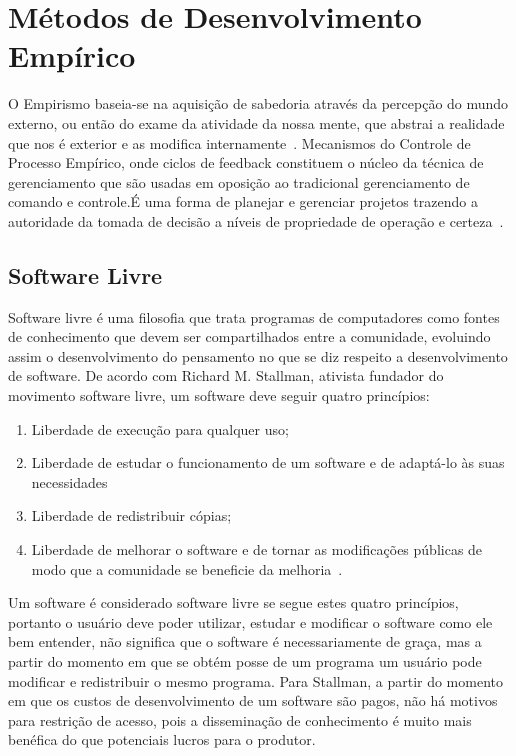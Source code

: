 \chapter{Métodos de Desenvolvimento Empírico}
\label{cap:desenvolvimento-empirico}

O Empirismo baseia-se na aquisição de sabedoria através da percepção do mundo externo, 
ou então do exame da atividade da nossa mente, que abstrai a realidade que nos
é exterior e as modifica internamente~\cite{chaui2003}.
%
Mecanismos do Controle de Processo Empírico, onde ciclos de feedback constituem o
núcleo da técnica de gerenciamento que são usadas em oposição ao tradicional 
gerenciamento de comando e controle.É uma forma de planejar e gerenciar projetos 
trazendo a autoridade da tomada de decisão a níveis de propriedade de operação e 
certeza~\cite{Schwaber2004}.
%

\section{Software Livre}

Software livre é uma filosofia que trata programas de computadores como fontes de 
conhecimento que devem ser compartilhados entre a comunidade, evoluindo assim o 
desenvolvimento do pensamento no que se diz respeito a desenvolvimento de software.
%
De acordo com Richard M. Stallman, ativista fundador do movimento software livre, 
um software deve seguir quatro princípios:
%
\begin{enumerate}
\item Liberdade de execução para qualquer uso;
\item Liberdade de estudar o funcionamento de um software e de adaptá-lo às suas necessidades
\item Liberdade de redistribuir cópias;
\item Liberdade de melhorar o software e de tornar as modificações públicas de modo que 
a comunidade se beneficie da melhoria~\cite{stallman2001}.
\end{enumerate}
%
Um software é considerado software livre se segue estes quatro princípios, portanto 
o usuário deve poder utilizar, estudar e modificar o software como ele bem entender, 
não significa que o software é necessariamente de graça, mas a partir do momento em 
que se obtém posse de um programa um usuário pode modificar e redistribuir o mesmo 
programa.
%
Para Stallman, a partir do momento em que os custos de desenvolvimento de um software 
são pagos, não há motivos para restrição de acesso, pois a disseminação de conhecimento 
é muito mais benéfica do que potenciais lucros para o produtor.
%

